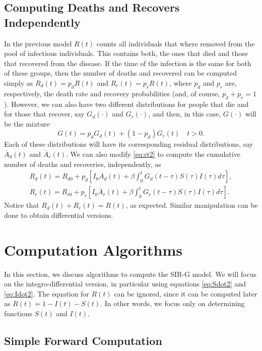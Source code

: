 \documentclass[USenglish,10pt]{article}
\newcommand{\Ab}{\overline{A}\xspace}
\begin{document}
\subsection{Computing Deaths and Recovers Independently}

In the previous model $R(t)$ counts all individuals that where removed from the pool of infectious individuals. This contains both, the ones that died and those that recovered from the disease. If the time of the infection is the same for both of these groups, then the number of deaths and recovered can be computed simply as $R_d(t)=p_dR(t)$ and $R_r(t)=p_rR(t)$, where $p_d$ and $p_r$ are, respectively, the death rate and recovery probabilities (and, of course, $p_d+p_r=1$).
However, we can also have  two different distributions for people that die and for those that recover, say $G_d(\cdot)$ and $G_r(\cdot)$, and then, in this case, $G(\cdot)$ will be the mixture
\[ G(t) = p_dG_d(t) + (1-p_d)G_r(t) \quad t>0.\]
Each of these distributions will have its corresponding residual distributions, say $\Ab_d(t)$ and $\Ab_r(t)$.
We can also modify \eqref{eq:rt2} to compute the cumulative number of deaths and recoveries, independently, as
\begin{equation*}
	\begin{gathered}
		R_d(t) = R_{d0} + p_d\left[I_0\Ab_d(t) + \beta \int_0^t G_d(t-\tau) S(\tau)I(\tau)d\tau\right], \\
		R_r(t) = R_{r0} + p_r\left[I_0\Ab_r(t) + \beta \int_0^t G_r(t-\tau) S(\tau)I(\tau)d\tau\right].
	\end{gathered}
\end{equation*}
Notice that $R_d(t) + R_r(t) = R(t)$, as expected. Similar manipulation can be done to obtain differential versions.


\section{Computation Algorithms}\label{sc:algorithm}

In this section, we discuss algorithms to compute the SIR-G model. We will focus on the integro-differential version, in particular using equations \eqref{eq:Sdot2} and \eqref{eq:Idot2}. The equation for $R(t)$ can be ignored, since it can be computed later as $R(t)=1-I(t)-S(t)$. In other words, we focus only on determining functions $S(t)$ and $I(t)$.

\subsection{Simple Forward Computation}
\end{document}
